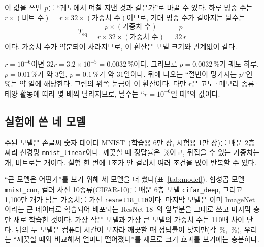 \documentclass[11pt,a4paper]{article}
\newcommand{\code}[1]{\texttt{#1}}
\newcounter{calc}
\begin{document}
이 값을 쓰면 $p$를 ``궤도에서 며칠 지낸 것과 같은가''로 바꿀 수 있다. 하루 명중 수는 $r\times(\text{비트 수})=r\times32\times(\text{가중치 수})$이므로, 기대 명중 수가 같아지는 날수는
\begin{equation}
  T_{\mathrm{eq}}=\frac{p\times(\text{가중치 수})}{r\times32\times(\text{가중치 수})}=\frac{p}{32\,r}
  \label{eq:teq}
\end{equation}
이다. 가중치 수가 약분되어 사라지므로, 이 환산은 모델 크기와 관계없이 같다.

\begin{calc}
$r=10^{-6}$이면 $32r=3.2\times10^{-5}=0.0032\,\%$이다. 그러므로 $p=0.0032\,\%$가 궤도 하루, $p=0.01\,\%$가 약 3일, $p=0.1\,\%$가 약 31일이다. 뒤에 나오는 ``절반이 망가지는 $p$''인 \PhalfNone\,\%는 약 \PhalfNoneDays{}일에 해당한다. 그림의 위쪽 눈금이 이 환산이다. 다만 $r$은 고도·메모리 종류·태양 활동에 따라 몇 배씩 달라지므로, 날수는 ``$r=10^{-6}$일 때''의 값이다.
\end{calc}

\subsection{실험에 쓴 네 모델}
주된 모델은 손글씨 숫자 데이터 MNIST~\citep{lecun1998}(학습용 6만 장, 시험용 1만 장)를 배운 2층짜리 신경망 \code{mnist\_linear}이다. 깨끗할 때 정답률은 \CleanAcc{}\,\%이고, 뒤집을 수 있는 가중치는 \NumWeights{}개, 비트로는 \NumBits{}개이다. 실험 한 번에 1초가 안 걸려서 여러 조건을 많이 반복할 수 있다.

``큰 모델은 어떤가''를 보기 위해 세 모델을 더 썼다(표~\ref{tab:model}). 합성곱 모델 \code{mnist\_cnn}, 컬러 사진 10종류(CIFAR-10)를 배운 6층 모델 \code{cifar\_deep}, 그리고 1,100만 개가 넘는 가중치를 가진 \code{resnet18\_t10}이다. 마지막 모델은 이미 ImageNet이라는 큰 데이터로 학습되어 배포되는 ResNet-18~\citep{he2016}의 앞부분을 그대로 쓰고 마지막 층만 새로 학습한 것이다. 가장 작은 모델과 가장 큰 모델의 가중치 수는 110배 차이 난다. 뒤의 두 모델은 컴퓨터 시간이 모자라 깨끗할 때 정답률이 낮지만(각 \CleanCifar{}\,\%, \CleanResnet{}\,\%), 우리는 ``깨끗할 때와 비교해서 얼마나 떨어졌나''를 재므로 크기 효과를 보기에는 충분하다.

\begin{table}[H]
  \centering\scriptsize
  \caption{실험에 쓴 네 모델. $N_w$는 뒤집을 수 있는 가중치 수, $N_{\mathrm{bits}}=32N_w$는 비트 수. ``명중/일''은 궤도에서 하루에 맞는 가중치 수($r=10^{-6}$/bit/day). $p_{50}$, $k_{50}$은 절반이 망가지는 $p$와 명중 수, LEO 일수는 식~\eqref{eq:teq}로 바꾼 날수.}
  \label{tab:model}
  
\end{table}
\end{document}
